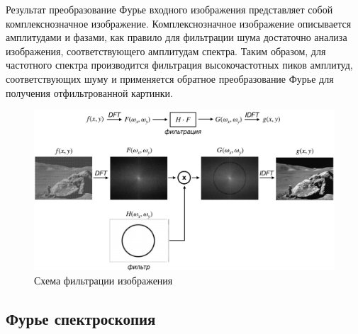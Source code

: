 Результат преобразование Фурье входного изображения представляет собой комплекснозначное изображение. Комплекснозначное изображение описывается амплитудами и фазами, как правило для фильтрации шума достаточно анализа изображения, соответствующего амплитудам спектра.
Таким образом, для частотного спектра производится фильтрация высокочастотных пиков амплитуд, соответствующих шуму и применяется обратное преобразование Фурье для получения отфильтрованной картинки.
\begin{figure}[!htb]
\centering
\includegraphics[width=16cm]{chapters/grigorev_s1/pictures/image_filtartion_with_scheme}%
\caption{Схема фильтрации изображения}
\end{figure}

\newpage
\subsection{Фурье спектроскопия}

